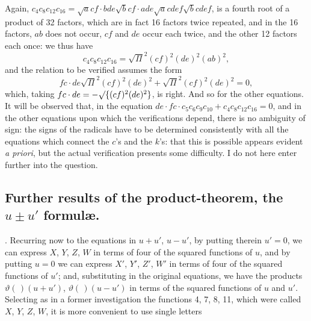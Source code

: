 \documentclass[12pt]{article}
\theoremstyle{plain}
\begin{document}
\newpage
\setcounter{page}{555}

Again, $c_4 c_8 c_{12} c_{16} = \surd acf \cdot bde \surd bcf \cdot ade \surd acdef \surd bcdef$, is a fourth root of a product of 32 factors, which are in fact 16 factors twice repeated, and in the 16 factors, $ab$ does not occur, $cf$ and $de$ occur each twice, and the other 12 factors each once: we thus have
\[
c_4 c_8 c_{12} c_{16} = \surd\Pi^2 (cf)^2 (de)^2 (ab)^2,
\]
and the relation to be verified assumes the form
\[
fc \cdot de \surd\Pi^2 (cf)^2 (de)^2 + \surd\Pi^2 (cf)^2 (de)^2 = 0,
\]
which, taking $fc \cdot de = -\surd\{(cf)^2 (de)^2\}$, is right. And so for the other equations. It will be observed that, in the equation $de \cdot fc \cdot c_5 c_6 c_9 c_{10} + c_4 c_8 c_{12} c_{16} = 0$, and in the other equations upon which the verifications depend, there is no ambiguity of sign: the signs of the radicals have to be determined consistently with all the equations which connect the $c$'s and the $k$'s: that this is possible appears evident \textit{a priori}, but the actual verification presents some difficulty. I do not here enter further into the question.

\subsection*{Further results of the product-theorem, the $u \pm u'$ formul\ae.}

. Recurring now to the equations in $u + u'$, $u - u'$, by putting therein $u' = 0$, we can express $X$, $Y$, $Z$, $W$ in terms of four of the squared functions of $u$, and by putting $u = 0$ we can express $X'$, $Y'$, $Z'$, $W'$ in terms of four of the squared functions of $u'$; and, substituting in the original equations, we have the products $\vartheta(\,)(u + u')$, $\vartheta(\,)(u - u')$ in terms of the squared functions of $u$ and $u'$. Selecting as in a former investigation the functions 4, 7, 8, 11, which were called $X$, $Y$, $Z$, $W$, it is more convenient to use single letters
\end{document}
